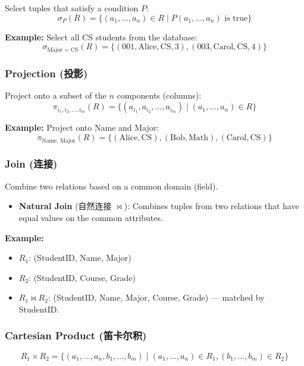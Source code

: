 \documentclass[10pt,a4paper,openany]{ctexbook}
\theoremstyle{definition}
\theoremstyle{remark}
\begin{document}
Select tuples that satisfy a condition $P$:
\[
\sigma_P(R) = \{(a_1, \dots, a_n) \in R \mid P(a_1, \dots, a_n) \text{ is true}\}
\]

\textbf{Example:} Select all CS students from the database:
\[
\sigma_{\text{Major = CS}}(R) = \{(001, \text{Alice}, \text{CS}, 3), (003, \text{Carol}, \text{CS}, 4)\}
\]

\subsubsection{Projection (投影)}

Project onto a subset of the $n$ components (columns):
\[
\pi_{i_1, i_2, \dots, i_m}(R) = \{(a_{i_1}, a_{i_2}, \dots, a_{i_m}) \mid (a_1, \dots, a_n) \in R\}
\]

\textbf{Example:} Project onto Name and Major:
\[
\pi_{\text{Name, Major}}(R) = \{(\text{Alice}, \text{CS}), (\text{Bob}, \text{Math}), (\text{Carol}, \text{CS})\}
\]

\subsubsection{Join (连接)}

Combine two relations based on a common domain (field).
\begin{itemize}
\item \textbf{Natural Join} (自然连接 $\bowtie$): Combines tuples from two relations that have equal values on the common attributes.

\end{itemize}

\textbf{Example:}
\begin{itemize}
\item $R_1$: (StudentID, Name, Major)
\item $R_2$: (StudentID, Course, Grade)
\item $R_1 \bowtie R_2$: (StudentID, Name, Major, Course, Grade) — matched by StudentID.

\end{itemize}

\subsubsection{Cartesian Product (笛卡尔积)}

\[
R_1 \times R_2 = \{(a_1, \dots, a_n, b_1, \dots, b_m) \mid (a_1, \dots, a_n) \in R_1, (b_1, \dots, b_m) \in R_2\}
\]

\vspace{-2pt}
\end{document}
